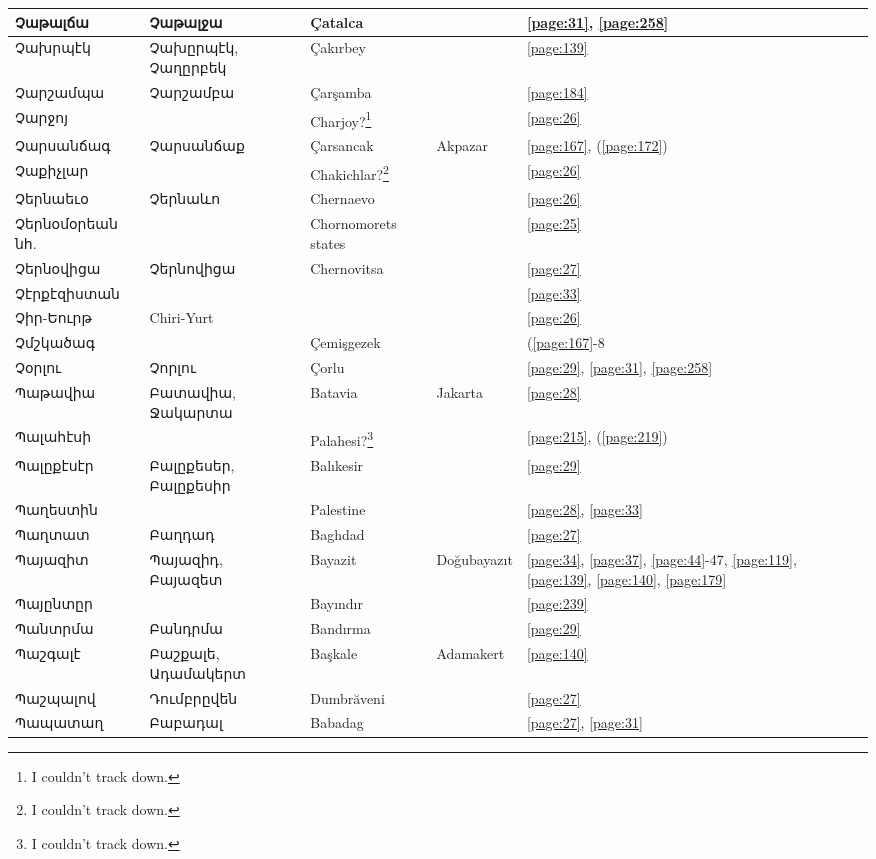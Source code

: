 \begin{center}
\begin{longtable}{|p{}|p{3cm}|p{3cm}|p{2cm}|p{3cm}|}
Չաթալճա&  Չաթալջա  &Çatalca & &\ref{page:31}, \ref{page:258}\\ \hline
Չախրպէկ&Չախըրպէկ, Չաղըրբեկ & Çakırbey& &\ref{page:139}\\ \hline
Չարշամպա&Չարշամբա &Çarşamba & &\ref{page:184}\\ \hline
Չարջոյ& & Charjoy?\footnote{I couldn't track down.}& &\ref{page:26}\\ \hline
Չարսանճագ& Չարսանճաք&Çarsancak &Akpazar &\ref{page:167}, (\ref{page:172})\\ \hline
Չաքիչլար& &Chakichlar?\footnote{I couldn't track down. } & &\ref{page:26}\\ \hline
Չերնաեւօ&Չերնաևո & Chernaevo& &\ref{page:26}\\ \hline
Չերնօմօրեան նհ.& &Chornomorets states & &\ref{page:25}\\ \hline
Չերնօվիցա&Չերնովիցա & Chernovitsa& &\ref{page:27}\\ \hline
Չէրքէզիստան& & & &\ref{page:33}\\ \hline
Չիր-Եուրթ& Chiri-Yurt& & &\ref{page:26}\\ \hline
Չմշկածագ& & Çemişgezek& &(\ref{page:167}-8\\ \hline
Չօրլու& Չորլու&Çorlu & &\ref{page:29}, \ref{page:31}, \ref{page:258}\\ \hline
Պաթավիա& Բատավիա, Ջակարտա&  Batavia&Jakarta &\ref{page:28}\\ \hline
Պալահէսի& &Palahesi?\footnote{I couldn't track down.} & &\ref{page:215}, (\ref{page:219})\\ \hline
Պալըքէսէր&  Բալըքեսեր, Բալըքեսիր&Balıkesir & &\ref{page:29}\\ \hline
Պաղեստին& &Palestine & &\ref{page:28}, \ref{page:33}\\ \hline
Պաղտատ& Բաղդադ&Baghdad & &\ref{page:27}\\ \hline
Պայազիտ&Պայազիդ, Բայազետ &  Bayazit  & Doğubayazıt &\ref{page:34}, \ref{page:37}, \ref{page:44}-47, \ref{page:119}, \ref{page:139}, \ref{page:140}, \ref{page:179}\\ \hline
Պայընտըր& &Bayındır & &\ref{page:239}\\ \hline
Պանտրմա& Բանդրմա&Bandırma & &\ref{page:29}\\ \hline
Պաշգալէ& Բաշքալե,  Ադամակերտ & Başkale&Adamakert&\ref{page:140}\\ \hline
Պաշպալով& Դումբրըվեն & Dumbrăveni& &\ref{page:27}\\ \hline
Պապատաղ&Բաբադալ &Babadag & &\ref{page:27}, \ref{page:31}\\ \hline

\end{longtable}
\end{center}
